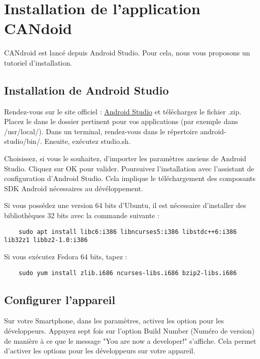 \section{Installation de l'application CANdoid}

CANdroid est lancé depuis Android Studio. Pour cela, nous vous proposons un tutoriel d'installation.

\subsection{Installation de Android Studio}

Rendez-vous sur le site officiel : \href{https://developer.android.com/studio}{Android Studio}  et téléchargez le fichier .zip. Placez le dans le dossier pertinent pour vos applications (par exemple dans /usr/local/). 
Dans un terminal, rendez-vous dans le répertoire android-studio/bin/. Ensuite, exécutez studio.sh.

Choisissez, si vous le souhaitez, d'importer les paramètres anciens de Android Studio. Cliquez sur OK pour valider.
Poursuivez l'installation avec l'assistant de configuration d'Android Studio. Cela implique le téléchargement des composants SDK Android nécessaires au dévéloppement. 

Si vous possédez une version 64 bits d'Ubuntu, il est nécessaire d'installer des bibliothèques 32 bits avec la commande suivante : 
\vspace{-1.8\baselineskip} 
\begin{lstlisting}
    sudo apt install libc6:i386 libncurses5:i386 libstdc++6:i386 lib32z1 libbz2-1.0:i386
\end{lstlisting}

Si vous exécutez Fedora 64 bits, tapez : 
\vspace{-1.8\baselineskip} 
\begin{lstlisting}
    sudo yum install zlib.i686 ncurses-libs.i686 bzip2-libs.i686
\end{lstlisting}

\subsection{Configurer l'appareil}

Sur votre Smartphone, dans les paramètres, activez les option pour les développeurs. 
Appuyez sept fois sur l'option Build Number (Numéro de version) de manière à ce que le message "You are now a developer!" s'affiche. Cela permet d'activer les options pour les développeurs sur votre appareil. 

